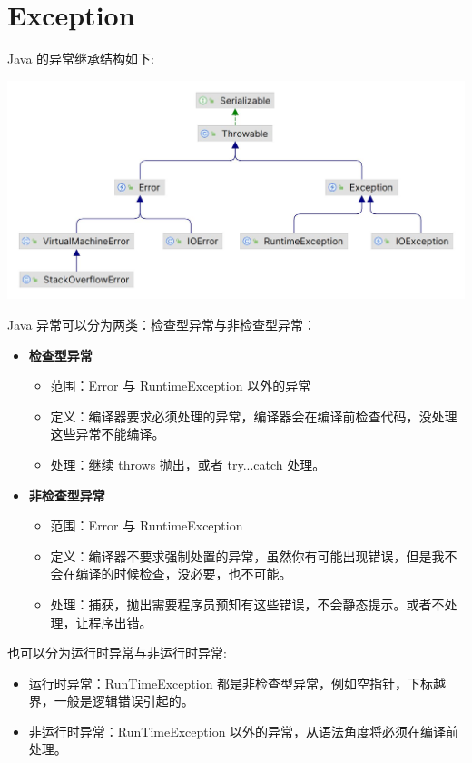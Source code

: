 \section{Exception}

Java 的异常继承结构如下:

\includegraphics[width=0.9\linewidth]{../../../imgs/Throwable.jpg}

Java 异常可以分为两类：检查型异常与非检查型异常：
\begin{itemize}
    \item \textbf{检查型异常}
    \begin{itemize}
        \item 范围：Error 与 RuntimeException 以外的异常
        \item 定义：编译器要求必须处理的异常，编译器会在编译前检查代码，没处理这些异常不能编译。
        \item 处理：继续 throws 抛出，或者 try...catch 处理。
    \end{itemize}
    \item \textbf{非检查型异常}
    \begin{itemize}
        \item 范围：Error 与 RuntimeException
        \item 定义：编译器不要求强制处置的异常，虽然你有可能出现错误，但是我不会在编译的时候检查，没必要，也不可能。
        \item 处理：捕获，抛出需要程序员预知有这些错误，不会静态提示。或者不处理，让程序出错。
    \end{itemize}
\end{itemize}

也可以分为运行时异常与非运行时异常:

\begin{itemize}
    \item 运行时异常：RunTimeException 都是非检查型异常，例如空指针，下标越界，一般是逻辑错误引起的。
    \item 非运行时异常：RunTimeException 以外的异常，从语法角度将必须在编译前处理。
\end{itemize}

